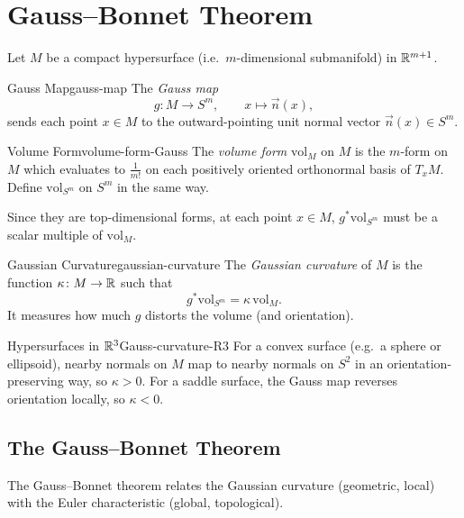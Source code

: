 
\section{Gauss--Bonnet Theorem}

Let $M$ be a compact hypersurface (i.e.\ $m$-dimensional submanifold) in $\mathbb{R}^{m+1}$.

\begin{definition}{Gauss Map}{gauss-map}
    The \emph{Gauss map}
    \[
        g \colon M \to S^m, \qquad x \mapsto \vec{n}(x),
    \]
    sends each point $x \in M$ to the outward-pointing unit normal vector $\vec{n}(x) \in S^m$.
\end{definition}

\begin{definition}{Volume Form}{volume-form-Gauss}
    The \emph{volume form} $\mathrm{vol}_M$ on $M$ is the $m$-form on $M$ which evaluates to $\frac{1}{m!}$ on each positively oriented orthonormal basis of $T_x M$. Define $\mathrm{vol}_{S^m}$ on $S^m$ in the same way.
\end{definition}

Since they are top-dimensional forms, at each point $x \in M$, $g^* \mathrm{vol}_{S^m}$ must be a scalar multiple of $\mathrm{vol}_M$.

\begin{definition}{Gaussian Curvature}{gaussian-curvature}
    The \emph{Gaussian curvature} of $M$ is the function $\kappa \colon M \to \mathbb{R}$ such that
    \[
        g^* \mathrm{vol}_{S^m} = \kappa\, \mathrm{vol}_M.
    \]
    It measures how much $g$ distorts the volume (and orientation).
\end{definition}

\begin{example}{Hypersurfaces in $\mathbb{R}^3$}{Gauss-curvature-R3}
    For a convex surface (e.g.\ a sphere or ellipsoid), nearby normals on $M$ map to nearby normals on $S^2$ in an orientation-preserving way, so $\kappa > 0$. For a saddle surface, the Gauss map reverses orientation locally, so $\kappa < 0$.
\end{example}

\subsection{The Gauss--Bonnet Theorem}

The Gauss--Bonnet theorem relates the Gaussian curvature (geometric, local) with the Euler characteristic (global, topological).

